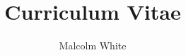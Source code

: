 \title{Curriculum Vitae}
\author{Malcolm White}

\address{50 Oakland St., Floor 2, Medford, MA 02155}
